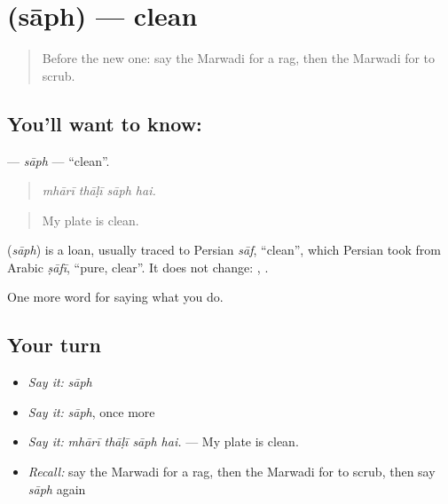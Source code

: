 \section[\texorpdfstring{\mw{साफ} (sāph)}{साफ (sāph)}]{ (sāph) — clean}

\label{lesson:MW-C171-saph}



\begin{quote}
Before the new one: say the Marwadi for a rag, then the Marwadi for to scrub.
\end{quote}

\subsection*{You'll want to know: }
\textbf{} — \emph{sāph} — \textquotedblleft{}clean\textquotedblright{}.

\begin{quote}
   
\end{quote}

\begin{quote}
\emph{mhārī thāḷī sāph hai.}
\end{quote}

\begin{quote}
My plate is clean.
\end{quote}

\begin{cousinweb}
\textbf{} (\emph{sāph}) is a loan, usually traced to Persian \emph{sāf}, \textquotedblleft{}clean\textquotedblright{}, which Persian took from Arabic \emph{ṣāfī}, \textquotedblleft{}pure, clear\textquotedblright{}. It does not change: \textbf{ }, \textbf{ }.
\end{cousinweb}

\begin{grammarlens}[title={What you've built}]
One more word for saying what you do.
\end{grammarlens}

\subsection*{Your turn}
\begin{itemize}
\raggedright
  \item \emph{Say it:} \emph{sāph}
  \item \emph{Say it:} \emph{sāph}, once more
  \item \emph{Say it:} \emph{mhārī thāḷī sāph hai.} — My plate is clean.
  \item \emph{Recall:} say the Marwadi for a rag, then the Marwadi for to scrub, then say \emph{sāph} again
\end{itemize}

